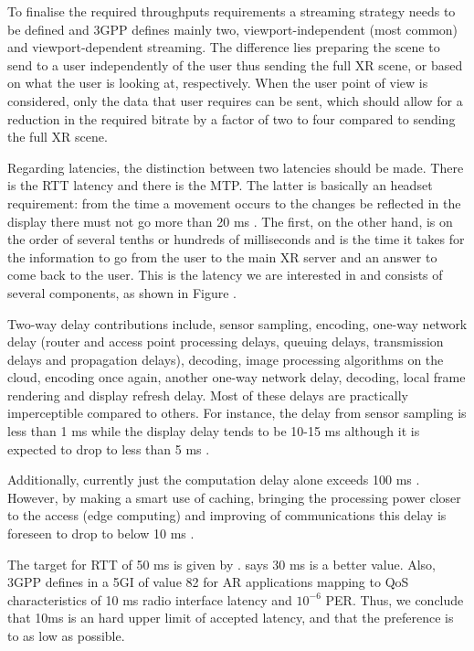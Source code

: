 To finalise the required throughputs requirements a streaming strategy needs to be defined and 3GPP \cite{3GPP_xr} defines mainly two, viewport-independent (most common) and viewport-dependent streaming. The difference lies preparing the scene to send to a user independently of the user thus sending the full XR scene, or based on what the user is looking at, respectively. When the user point of view is considered, only the data that user requires can be sent, which should allow for a reduction in the required bitrate by a factor of two to four compared to sending the full XR scene. 


Regarding latencies, the distinction between two latencies should be made. There is the \ac{RTT} latency and there is the \ac{MTP}. The latter is basically an headset requirement: from the time a movement occurs to the changes be reflected in the display there must not go more than 20 ms \cite{3GPP_xr, Elbamby_towards_low_latency_vr}. The first, on the other hand, is on the order of several tenths or hundreds of milliseconds and is the time it takes for the information to go from the user to the main XR server and an answer to come back to the user. This is the latency we are interested in and consists of several components, as shown in Figure .%


Two-way delay contributions include, sensor sampling, encoding, one-way network delay (router and access point processing delays, queuing delays, transmission delays and propagation delays), decoding, image processing algorithms on the cloud, encoding once again, another one-way network delay, decoding, local frame rendering and display refresh delay. Most of these delays are practically imperceptible compared to others. For instance, the delay from sensor sampling is less than 1 ms while the display delay tends to be 10-15 ms \cite{bastug_towards_interconnected_vr} although it is expected to drop to less than 5 ms \cite{vr_on_the_edge}. 

Additionally, currently just the computation delay alone exceeds 100 ms \cite{vr_on_the_edge}. However, by making a smart use of caching, bringing the processing power closer to the access (edge computing) and improving of communications \cite{Elbamby_towards_low_latency_vr, bastug_towards_interconnected_vr, 3GPP_xr} this delay is foreseen to drop to below 10 ms \cite{vr_on_the_edge}. 

The target for \ac{RTT} of 50 ms is given by \cite{3GPP_xr}. \cite{vr_on_the_edge} says 30 ms is a better value. Also, 3GPP defines in \cite{3GPP_xr} a \ac{5GI} of value 82 for \ac{AR} applications mapping to \ac{QoS} characteristics of 10 ms radio interface latency and $10^{-6}$ \ac{PER}. Thus, we conclude that 10ms is an hard upper limit of accepted latency, and that the preference is to as low as possible.

